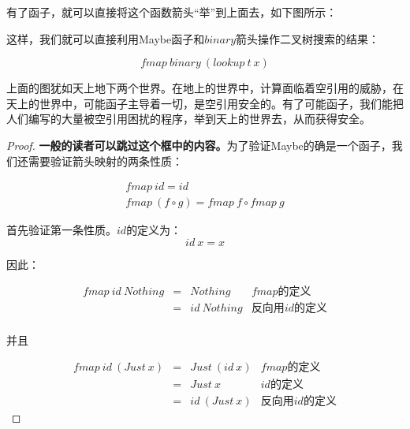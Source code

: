 \documentclass{article}
\begin{document}
\begin{example}
有了函子，就可以直接将这个函数箭头“举”到上面去，如下图所示：

\begin{center}
\end{center}

这样，我们就可以直接利用Maybe函子和$binary$箭头操作二叉树搜索的结果：

\[
fmap\ binary\ (lookup\ t\ x)
\]

上面的图犹如天上地下两个世界。在地上的世界中，计算面临着空引用的威胁，在天上的世界中，可能函子主导着一切，是空引用安全的。有了可能函子，我们能把人们编写的大量被空引用困扰的程序，举到天上的世界去，从而获得安全。

\begin{mdframed}
\begin{proof}
\textbf{一般的读者可以跳过这个框中的内容。}为了验证Maybe的确是一个函子，我们还需要验证箭头映射的两条性质：

\[
\begin{array}{l}
fmap\ id = id \\
fmap\ (f \circ g) = fmap\ f \circ fmap\ g
\end{array}
\]

首先验证第一条性质。$id$的定义为：
\[
id\ x = x
\]

因此：

\[
\begin{array}{rcll}
fmap\ id\ Nothing & = & Nothing & \text{$fmap$的定义} \\
                  & = & id\ Nothing & \text{反向用$id$的定义} \\
\end{array}
\]

并且

\[
\begin{array}{rcll}
fmap\ id\ (Just\ x) & = & Just\ (id\ x) & \text{$fmap$的定义} \\
                    & = & Just\ x & \text{$id$的定义} \\
                    & = & id\ (Just\ x) & \text{反向用$id$的定义}
\end{array}
\]


\end{proof}
\end{mdframed}
\end{example}
\end{document}
